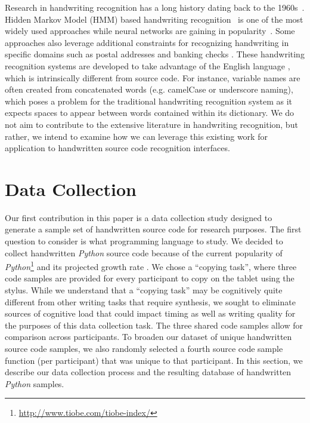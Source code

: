 \documentclass{vgtc}                          %
\begin{document}
Research in handwriting recognition has a long history dating back to the 1960s~\cite{tappert1990state}. Hidden Markov Model (HMM) based handwriting recognition~\cite{hu1996hmm,kundu1988recognition,nag1986script} is one of the 
most widely used approaches while neural networks are gaining in popularity~\cite{jaeger2001online}. Some approaches also leverage additional constraints for recognizing handwriting in specific domains such as postal addresses \cite{srihari1993recognition, srihari1993interpretation} and banking checks \cite{gorski1999a2ia, agarwal1997bank}. These handwriting recognition systems are developed to take advantage of the English language \cite{van2003using}, which is intrinsically different from source code. For instance, variable names are often created from
concatenated words (e.g. camelCase or underscore naming), which poses a problem for the traditional handwriting
recognition system as it expects spaces to appear between words
contained within its dictionary.   We do not aim to contribute to the extensive literature in handwriting recognition, but rather, we intend to examine how we can leverage this existing work for application to handwritten source code recognition interfaces.  




\section{Data Collection}

Our first contribution in this paper is a data collection study designed to generate a sample set of handwritten source code for research purposes.  The first question to consider is what programming language to study.  We decided to collect handwritten \textit{Python} source code because of the current popularity of \textit{Python}\footnote{\url{http://www.tiobe.com/tiobe-index/}} and its projected growth rate 
\cite{radenski2006python}. 
We chose a ``copying task'', where three code samples are provided for every participant to copy on the tablet using the stylus. While we understand that a ``copying task'' may be cognitively quite different from other writing tasks that require synthesis, we sought to eliminate sources of cognitive load that could impact timing as well as writing quality for the purposes of this data collection task. The three shared code samples allow for comparison across participants. To broaden our dataset of unique handwritten source code samples, we also randomly selected a fourth source code sample function (per participant) that was unique to that participant. In this section, we describe our data collection process and the resulting database of handwritten \textit{Python} samples.
\end{document}
